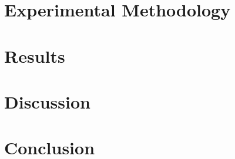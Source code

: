 \documentclass[11pt,a4paper]{article}
\def\SHAREDLATEX{../../latex}
\begin{document}
\section{Experimental Methodology}
\label{sec:methodology}

\section{Results}
\label{sec:results}

\section{Discussion}
\label{sec:discussion}

\section{Conclusion}
\label{sec:conclusion}

\nocite{eslami2026control}


\end{document}
